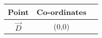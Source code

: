 \begin{tabular}{|c|c|c|}
\hline
Point & Co-ordinates \\
\hline
$\vec{D}$ & (0,0) \\
\hline
\end{tabular}
